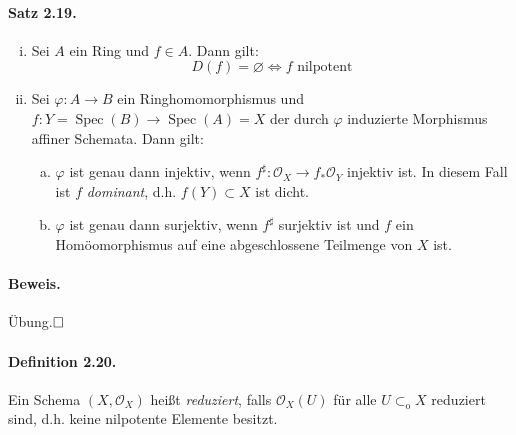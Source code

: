 \documentclass[11pt,b5paper,openany]{memoir}
\def \qed {$\hfill\square$}
\begin{document}
\paragraph{Satz 2.19.}\label{2.19} \begin{enumerate}[(i)]
\item Sei $A$ ein Ring und $f\in A$. Dann gilt:
\[D(f)=\varnothing\iff f\text{ nilpotent} \]
\item Sei $\varphi:A\to B$ ein Ringhomomorphismus und $f: Y=\operatorname{Spec}(B)\to\operatorname{Spec}(A)=X$ der durch $\varphi$ induzierte Morphismus affiner Schemata. Dann gilt:
\begin{enumerate}[(a)]
\item $\varphi$ ist genau dann injektiv, wenn $f^\sharp:\mathcal{O}_X\to f_\ast\mathcal{O}_Y$ injektiv ist. In diesem Fall ist $f$ \textit{dominant}, d.h. $f(Y)\subset X$ ist dicht.
\item $\varphi$ ist genau dann surjektiv, wenn $f^\sharp$ surjektiv ist und $f$ ein Homöomorphismus auf eine abgeschlossene Teilmenge von $X$ ist.
\end{enumerate}
\end{enumerate}

\paragraph{Beweis.} Übung.\qed


\paragraph{Definition 2.20.}\label{2.20} Ein Schema $(X,\mathcal{O}_X)$ heißt \textit{reduziert}, falls $\mathcal{O}_X(U)$ für alle $U\subset_\text{o}X$ reduziert sind, d.h. keine nilpotente Elemente besitzt.
\end{document}
